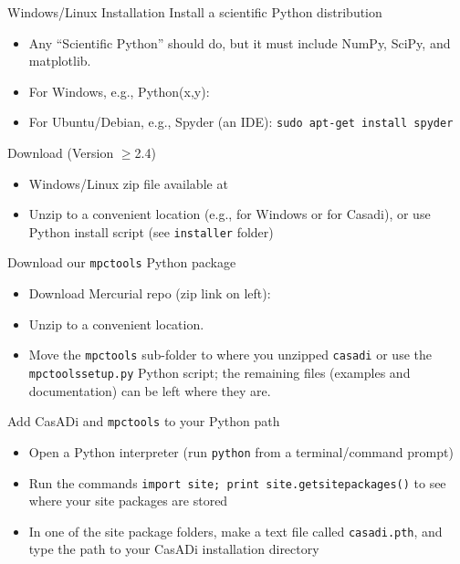 \documentclass[xcolor=dvipsnames]{beamer}
\begin{document}
%
\begin{frame}[allowframebreaks]{Windows/Linux Installation}
    Install a scientific Python distribution
    \begin{itemize}
        \item Any ``Scientific Python'' should do, but it must include NumPy, SciPy, and matplotlib.
        \item For Windows, e.g., Python(x,y): 
        \item For Ubuntu/Debian, e.g., Spyder (an IDE): \lstinline[style=shell]@sudo apt-get install spyder@
    \end{itemize}
    
    \medskip
    
    Download \casadi (Version $\ge$2.4)
    \begin{itemize}
        \item Windows/Linux zip file available at 
        \item Unzip to a convenient location (e.g.,  for Windows or  for Casadi), or use Python install script (see \texttt{installer} folder)
    \end{itemize}
    
    \framebreak
    
    Download our \texttt{mpctools} Python package
    \begin{itemize}
        \item Download Mercurial repo (zip link on left): 
        \item Unzip to a convenient location.
        \item Move the \texttt{mpctools} sub-folder to where you unzipped \texttt{casadi} or use the \texttt{mpctoolssetup.py} Python script; the remaining files (examples and documentation) can be left where they are.
    \end{itemize}
    
    \medskip
    
    Add CasADi and \texttt{mpctools} to your Python path
    \begin{itemize}
        \item Open a Python interpreter (run \lstinline[style=shell]!python! from a terminal/command prompt)
        \item Run the commands \lstinline[style=python]!import site; print site.getsitepackages()! to see where your site packages are stored
        \item In one of the site package folders, make a text file called \texttt{casadi.pth}, and type the path to your CasADi installation directory
    \end{itemize}
\end{frame}
\end{document}
